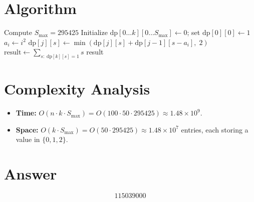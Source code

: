 \documentclass[12pt]{article}
\begin{document}
\section{Algorithm}

\begin{algorithmic}[1]
\State Compute $S_{\max} = 295425$
\State Initialize $\mathrm{dp}[0 \ldots k][0 \ldots S_{\max}] \gets 0$; set $\mathrm{dp}[0][0] \gets 1$
    \State $a_i \gets i^2$
            \State $\mathrm{dp}[j][s] \gets \min(\mathrm{dp}[j][s] + \mathrm{dp}[j-1][s - a_i],\; 2)$
        \EndFor
    \EndFor
\EndFor
\State $\mathrm{result} \gets \sum_{s:\;\mathrm{dp}[k][s]=1} s$
\State \Return result
\end{algorithmic}

\section{Complexity Analysis}
\begin{itemize}
    \item \textbf{Time:} $O(n \cdot k \cdot S_{\max}) = O(100 \cdot 50 \cdot 295425) \approx 1.48 \times 10^9$.
    \item \textbf{Space:} $O(k \cdot S_{\max}) = O(50 \cdot 295425) \approx 1.48 \times 10^7$ entries, each storing a value in $\{0,1,2\}$.
\end{itemize}

\section{Answer}

\[
\boxed{115039000}
\]
\end{document}
